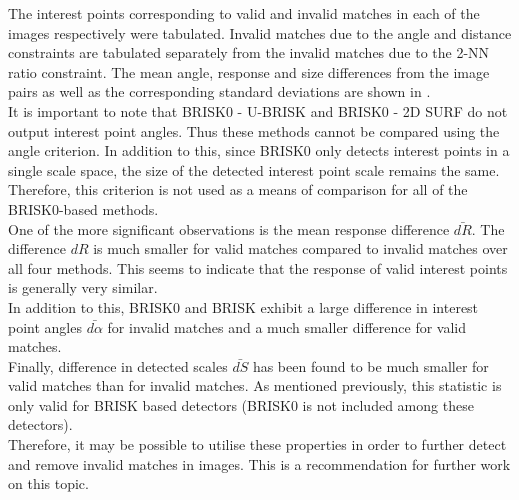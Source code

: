 \documentclass{report}
\begin{document}
The interest points corresponding to valid and invalid matches in each of the images respectively were tabulated. Invalid matches due to the angle and distance constraints are tabulated separately from the invalid matches due to the 2-NN ratio constraint. The mean angle, response and size differences from the image pairs as well as the corresponding standard deviations are shown in .\\

It is important to note that BRISK0 - U-BRISK and BRISK0 - 2D SURF do not output interest point angles. Thus these methods cannot be compared using the angle criterion. In addition to this, since BRISK0 only detects interest points in a single scale space, the size of the detected interest point scale remains the same. Therefore, this criterion is not used as a means of comparison for all of the BRISK0-based methods.\\

One of the more significant observations is the mean response difference $\bar{dR}$. The difference $dR$ is much smaller for valid matches compared to invalid matches over all four methods. This seems to indicate that the response of valid interest points is generally very similar.\\

In addition to this, BRISK0 and BRISK exhibit a large difference in interest point angles $\bar{d\alpha}$ for invalid matches and a much smaller difference for valid matches. \\

Finally, difference in detected scales $\bar{dS}$ has been found to be much smaller for valid matches than for invalid matches. As mentioned previously, this statistic is only valid for BRISK based detectors (BRISK0 is not included among these detectors).\\

Therefore, it may be possible to utilise these properties in order to further detect and remove invalid matches in images. This is a recommendation for further work on this topic.\\

\end{document}
